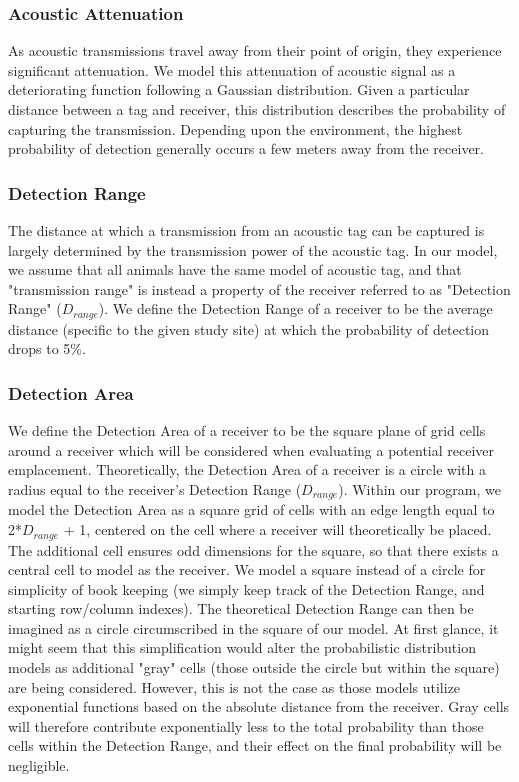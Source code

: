 \subsubsection{Acoustic Attenuation}
\label{acousticAttenuation}
As acoustic transmissions travel away from their point of origin, they experience significant attenuation.  We model this attenuation of acoustic signal as a deteriorating function following a Gaussian distribution.  Given a particular distance between a tag and receiver, this distribution describes the probability of capturing the transmission.  Depending upon the environment, the highest probability of detection generally occurs a few meters away from the receiver.

\subsubsection{Detection Range}
\label{detectionRange}
The distance at which a transmission from an acoustic tag can be captured is largely determined by the transmission power of the acoustic tag.  In our model, we assume that all animals have the same model of acoustic tag, and that "transmission range" is instead a property of the receiver referred to as "Detection Range" ($D_{range}$).  We define the Detection Range of a receiver to be the average distance (specific to the given study site) at which the probability of detection drops to 5\%.

\subsubsection{Detection Area}
\label{detectionArea}
We define the Detection Area of a receiver to be the square plane of grid cells around a receiver which will be considered when evaluating a potential receiver emplacement.  Theoretically, the Detection Area of a receiver is a circle with a radius equal to the receiver's Detection Range ($D_{range}$).  Within our program, we model the Detection Area as a square grid of cells with an edge length equal to 2*$D_{range}$ + 1, centered on the cell where a receiver will theoretically be placed.  The additional cell ensures odd dimensions for the square, so that there exists a central cell to model as the receiver.  We model a square instead of a circle for simplicity of book keeping (we simply keep track of the Detection Range, and starting row/column indexes).  The theoretical Detection Range can then be imagined as a circle circumscribed in the square of our model.  At first glance, it might seem that this simplification would alter the probabilistic distribution models as additional "gray" cells (those outside the circle but within the square) are being considered.  However, this is not the case as those models utilize exponential functions based on the absolute distance from the receiver.  Gray cells will therefore contribute exponentially less to the total probability than those cells within the Detection Range, and their effect on the final probability will be negligible.  

